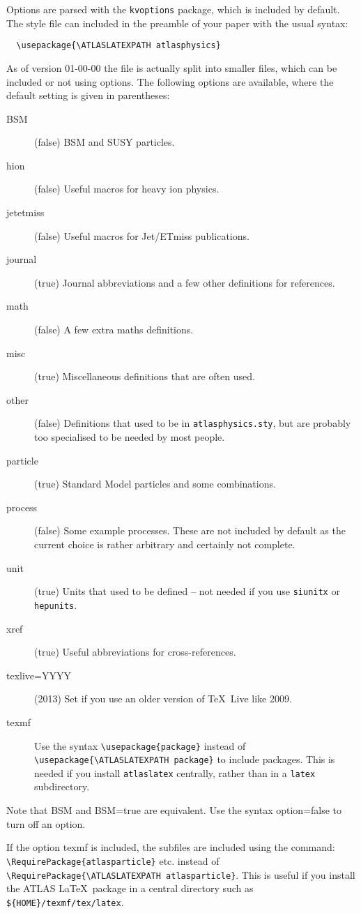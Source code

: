 \documentclass[UKenglish,texlive=2013]{\ATLASLATEXPATH atlasdoc}
\newcommand{\File}[1]{\texttt{#1}\xspace}
\newcommand{\Macro}[1]{\texttt{\textbackslash #1}\xspace}
\newcommand{\Option}[1]{\textsf{#1}\xspace}
\newcommand{\Package}[1]{\texttt{#1}\xspace}
\begin{document}
Options are parsed with the \Package{kvoptions} package, which is included by default.
The style file can included in the preamble of your paper with the usual
syntax:
%
\begin{verbatim}
  \usepackage{\ATLASLATEXPATH atlasphysics}
\end{verbatim}
%
As of version 01-00-00 the file is actually split into smaller files,
which can be included or not using options.
The following options are available, where the default setting is given in parentheses:
\begin{description}
\item[BSM](false) BSM and SUSY particles.
\item[hion](false) Useful macros for heavy ion physics.
\item[jetetmiss](false) Useful macros for Jet/ETmiss publications.
\item[journal](true) Journal abbreviations and a few other definitions for references.
\item[math](false) A few extra maths definitions.
\item[misc](true) Miscellaneous definitions that are often used.
\item[other](false) Definitions that used to be in \File{atlasphysics.sty}, 
  but are probably too specialised to be needed by most people.
\item[particle](true) Standard Model particles and some combinations.
\item[process](false) Some example processes. 
  These are not included by default as the current choice is rather arbitrary
  and certainly not complete.
\item[unit](true) Units that used to be defined -- not needed if you use \Package{siunitx} or \Package{hepunits}.
\item[xref](true) Useful abbreviations for cross-references.
\item[texlive=YYYY](2013) Set if you use an older version of \TeX\ Live like 2009.
\item[texmf] Use the syntax \Macro{usepackage\{package\}}
  instead of \Macro{usepackage\{\textbackslash ATLASLATEXPATH package\}} to include packages.
  This is needed if you install \Package{atlaslatex} centrally,
  rather than in a \File{latex} subdirectory.
\end{description}
Note that \Option{BSM} and \Option{BSM=true} are equivalent.
Use the syntax \Option{option=false} to turn off an option.

If the  option \Option{texmf} is included, the subfiles are included using the command:
\verb|\RequirePackage{atlasparticle}| etc. instead of \verb|\RequirePackage{\ATLASLATEXPATH atlasparticle}|.
This is useful if you install the ATLAS \LaTeX\ package in a central directory such as \File{\$\{HOME\}/texmf/tex/latex}.
\end{document}
